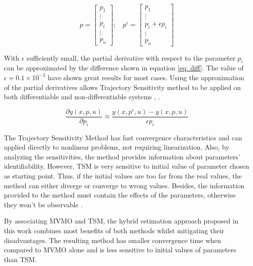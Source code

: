 \begin{equation}
	p = 
	\begin{bmatrix}
		p_{1} \\
		\vdots \\
		p_{i} \\
		\vdots \\
		p_{n}
	\end{bmatrix}; \ \ \ \ 
	 p^{\epsilon} =
	\begin{bmatrix}
		p_{1} \\
		\vdots \\
		p_{i} + \epsilon p_{i} \\
		\vdots \\
		p_{n}
	\end{bmatrix}
	\label{eq: pvecs}
\end{equation}

With $\epsilon$ sufficiently small, the partial derivative with respect to the parameter $p_{i}$ can be approximated by the difference shown in equation \eqref{eq: diff}. The value of $\epsilon = 0.1 \times 10^{-3}$ have shown great results for most cases. Using the approximation of the partial derivatives allows Trajectory Sensitivity method to be applied on both differentiable and non-differentiable systems \cite{Benchluch1993}, \cite{Cari2006}.
 

\begin{equation}
	\frac{\partial y(x, p, u)}{\partial p_{i}} \approx \frac{y(x, p^{\epsilon}, u) - y(x, p, u)}{\epsilon p_{i}}
	\label{eq: diff}
\end{equation}

The Trajectory Sensitivity Method has fast convergence characteristics and can applied directly to nonlinear problems, not requiring linearization. Also, by analyzing the sensitivities, the method provides information about parameters' identifiability. However, TSM is very sensitive to initial value of parameter chosen as starting point. Thus, if the initial values are too far from the real values, the method can either diverge or converge to wrong values. Besides, the information provided to the method must contain the effects of the parameters, otherwise they won't be observable \cite{Benchluch1993}.

By associating MVMO and TSM, the hybrid estimation approach proposed in this work combines most benefits of both methods whilst mitigating their disadvantages. The resulting method has smaller convergence time when compared to MVMO alone and is less sensitive to initial values of parameters than TSM.

